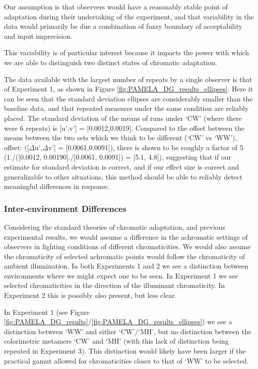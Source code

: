 Our assumption is that observers would have a reasonably stable point of adaptation during their undertaking of the experiment, and that variability in the data would primarily be due a combination of fuzzy boundary of acceptability and input imprecision. 

This variability is of particular interest because it impacts the power with which we are able to distinguish two distinct states of chromatic adaptation.

The data available with the largest number of repeats by a single observer is that of Experiment 1, as shown in Figure \ref{fig:PAMELA_DG_results_ellipses}. Here it can be seen that the standard deviation ellipses are considerably smaller than the baseline data, and that repeated measures under the same condition are reliably placed. The standard deviation of the means of runs under `CW' (where there were 6 repeats) is [u',v'] = [0.0012,0.0019]. Compared to the offset between the means between the two sets which we think to be different (`CW' vs `WW'), offset: ([$\Delta$u',$\Delta$v'] = [0.0061,0.0091]), there is shown to be roughly a factor of 5 (1./([0.0012, 0.00190]./[0.0061, 0.0091]) = [5.1, 4.8]), suggesting that if our estimate for standard deviation is correct, and if our effect size is correct and generalizable to other situations, this method should be able to reliably detect meaningful differences in response.

\subsubsection{Inter-environment Differences}

Considering the standard theories of chromatic adaptation, and previous experimental results, we would assume a difference in the achromatic settings of observers in lighting conditions of different chromaticities. We would also assume the chromaticity of selected achromatic points would follow the chromaticity of ambient illumination. In both Experiments 1 and 2 we see a distinction between environments where we might expect one to be seen. In Experiment 1 we see selected chromaticities in the direction of the illuminant chromaticity. In Experiment 2 this is possibly also present, but less clear.

In Experiment 1 (see Figure \ref{fig:PAMELA_DG_results}/\ref{fig:PAMELA_DG_results_ellipses}) we see a distinction between `WW' and either `CW'/`MH', but no distinction between the colorimetric metamers `CW' and `MH' (with this lack of distinction being repeated in Experiment 3). This distinction would likely have been larger if the practical gamut allowed for chromaticities closer to that of `WW' to be selected. 

